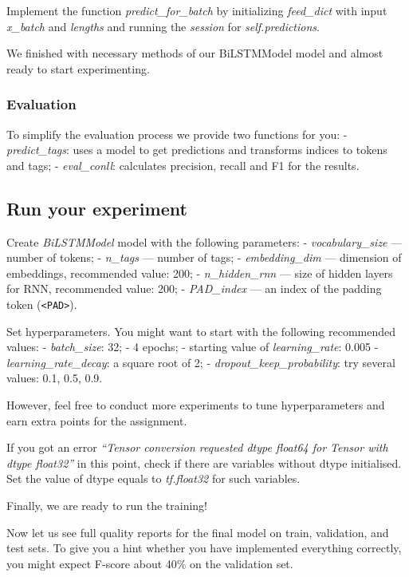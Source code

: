 \documentclass[11pt]{article}
\begin{document}
    Implement the function \emph{predict\_for\_batch} by initializing
\emph{feed\_dict} with input \emph{x\_batch} and \emph{lengths} and
running the \emph{session} for \emph{self.predictions}.

    We finished with necessary methods of our BiLSTMModel model and almost
ready to start experimenting.

\hypertarget{evaluation}{%
\subsubsection{Evaluation}\label{evaluation}}

To simplify the evaluation process we provide two functions for you: -
\emph{predict\_tags}: uses a model to get predictions and transforms
indices to tokens and tags; - \emph{eval\_conll}: calculates precision,
recall and F1 for the results.

    \hypertarget{run-your-experiment}{%
\subsection{Run your experiment}\label{run-your-experiment}}

    Create \emph{BiLSTMModel} model with the following parameters: -
\emph{vocabulary\_size} --- number of tokens; - \emph{n\_tags} ---
number of tags; - \emph{embedding\_dim} --- dimension of embeddings,
recommended value: 200; - \emph{n\_hidden\_rnn} --- size of hidden
layers for RNN, recommended value: 200; - \emph{PAD\_index} --- an index
of the padding token (\texttt{\textless{}PAD\textgreater{}}).

Set hyperparameters. You might want to start with the following
recommended values: - \emph{batch\_size}: 32; - 4 epochs; - starting
value of \emph{learning\_rate}: 0.005 - \emph{learning\_rate\_decay}: a
square root of 2; - \emph{dropout\_keep\_probability}: try several
values: 0.1, 0.5, 0.9.

However, feel free to conduct more experiments to tune hyperparameters
and earn extra points for the assignment.

    If you got an error \emph{``Tensor conversion requested dtype float64
for Tensor with dtype float32''} in this point, check if there are
variables without dtype initialised. Set the value of dtype equals to
\emph{tf.float32} for such variables.

    Finally, we are ready to run the training!

    Now let us see full quality reports for the final model on train,
validation, and test sets. To give you a hint whether you have
implemented everything correctly, you might expect F-score about 40\% on
the validation set.
\end{document}
